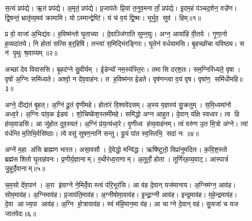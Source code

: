 \clearpage
{}
\setcounter{anuvakam}{0}

स॒त्यं प्रप॑द्ये।
ऋ॒तं प्रप॑द्ये।
अ॒मृतं॒ प्रप॑द्ये।
प्र॒जाप॑तेः प्रि॒यां त॒नुव॒मनार्तां॒ प्रप॑द्ये।
इ॒दम॒हं प॑ञ्चद॒शेन॒ वज्रे॑ण।
द्वि॒षन्तं॒ भ्रातृ॑व्य॒मव॑ क्रामामि।
योऽस्मान्द्वेष्टि॑।
यं च॑ व॒यं द्वि॒ष्मः।
भूर्भुव॒ सुव॑।
हिम्॥१॥\anuvakamend[स॒त्यं दश॑]

प्र वो॒ वाजा॑ अ॒भिद्य॑वः।
ह॒विष्म॑न्तो घृ॒ताच्या।
दे॒वाञ्जि॑गाति सुम्न॒युः।
अग्न॒ आया॑हि वी॒तये।
गृ॒णा॒नो ह॒व्यदा॑तये।
नि होता॑ सत्सि ब॒र्॒हिषि॑।
तन्त्वा॑ स॒मिद्भि॑रङ्गिरः।
घृ॒तेन॑ वर्धयामसि।
बृ॒हच्छो॑चा यविष्ठ्य।
स न॑ पृ॒थुः श्र॒वाय्यम्॥२॥

अच्छा॑ देव विवाससि।
बृ॒हद॑ग्ने सु॒वीर्यम्।
ई॒डेन्यो॑ नम॒स्य॑स्ति॒रः।
तमासि दर्‌श॒तः।
सम॒ग्निरि॑ध्यते॒ वृषा।
वृषो॑ अ॒ग्निः समि॑ध्यते।
अश्वो॒ न दे॑व॒वाह॑नः।
त ह॒विष्म॑न्त ईडते।
वृष॑णन्त्वा व॒यं वृष\sn{}।
वृषा॑ण॒ समि॑धीमहि॥३॥

अग्ने॒ दीद्य॑तं बृ॒हत्।
अ॒ग्निं दू॒तं वृ॑णीमहे।
होता॑रं वि॒श्ववे॑दसम्।
अ॒स्य य॒ज्ञस्य॑ सु॒क्रतुम्।
स॒मि॒ध्यमा॑नो अध्व॒रे।
अ॒ग्निः पा॑व॒क ईड्य॑।
शो॒चिष्के॑श॒स्तमी॑महे।
समि॑द्धो अग्न आहुत।
दे॒वान् य॑क्षि स्वध्वर।
त्व हि ह॑व्य॒वाडसि॑।
आ जु॑होत दुव॒स्यत॑।
अ॒ग्निं प्र॑य॒त्य॑ध्व॒रे।
वृ॒णीध्व ह॑व्य॒वाह॑नम्।
त्वं वरु॑ण उ॒त मि॒त्रो अ॑ग्ने।
त्वां व॑र्धन्ति म॒तिभि॒र्वसि॑ष्ठाः।
त्वे वसु॑ सुषण॒नानि॑ सन्तु।
यू॒यं पा॑त स्व॒स्तिभि॒ सदा॑ नः ॥४॥\anuvakamend[श्र॒वाय्य॑मिधीम॒ह्यसि॑ स॒प्त च॑]

अग्ने॑ म॒हा अ॑सि ब्राह्मण भारत।
असा॒वसौ।
दे॒वेद्धो॒ मन्वि॑द्धः।
ऋषि॑ष्टुतो॒ विप्रा॑नुमदितः।
क॒वि॒श॒स्तो ब्रह्म॑सशितो घृ॒ताह॑वनः।
प्र॒णीर्य॒ज्ञानाम्।
र॒थीर॑ध्व॒राणाम्।
अ॒तूर्तो॒ होता।
तूर्णि॑र्‌हव्य॒वाट्।
आस्पात्रं॑ जु॒हूर्दे॒वानाम्॥५॥

च॒म॒सो दे॑व॒पान॑।
अ॒रा इ॑वाग्ने ने॒मिर्दे॒वास्त्वं प॑रि॒भूर॑सि।
आ व॑ह दे॒वान् यज॑मानाय।
अ॒ग्निम॑ग्न॒ आव॑ह।
सोम॒माव॑ह।
अ॒ग्निमाव॑ह।
प्र॒जाप॑ति॒माव॑ह।
अ॒ग्नीषोमा॒वाव॑ह।
इ॒न्द्रा॒ग्नी आव॑ह।
इन्द्र॒माव॑ह।
म॒हे॒न्द्रमाव॑ह।
दे॒वा आज्य॒पा आव॑ह।
अ॒ग्नि हो॒त्रायाव॑ह।
स्वं म॑हि॒मान॒मा व॑ह।
आ चाग्ने दे॒वान् वह॑।
सु॒यजा॑ च यज जातवेदः॥६॥\anuvakamend[दे॒वाना॒मिन्द्र॒मा व॑ह॒ षट् च॑]

